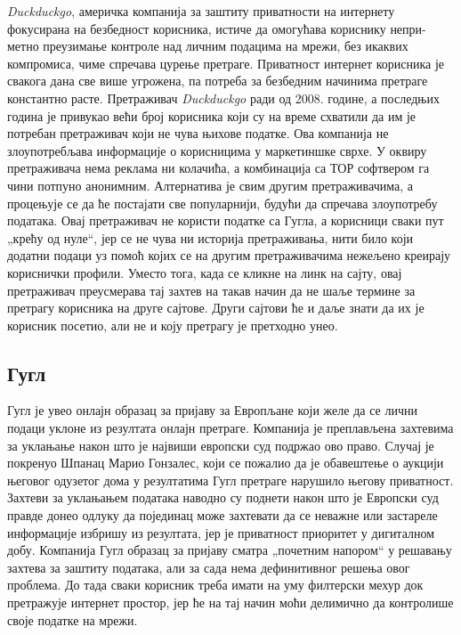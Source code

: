 \documentclass[a4paper]{article}
\begin{document}
\emph{Duckduckgo}, америчка компанија за заштиту приватности на интернету фокусирана на безбедност корисника, истиче да омогућава кориснику непри-
метно преузимање контроле над личним подацима на мрежи, без икаквих компромиса, чиме спречава цурење претраге. Приватност интернет корисника је свакога дана све више угрожена, па потреба за безбедним начинима претраге константно расте. Претраживач \emph{Duckduckgo} ради од 2008. године, а последњих година је привукао већи број корисника који су на време схватили да им је потребан претраживач који не чува њихове податке. Ова компанија не злоупотребљава информације о корисницима у маркетиншке сврхе. У оквиру претраживача нема реклама ни колачића, а комбинација са ТОР софтвером га чини потпуно анонимним. Алтернатива је свим другим претраживачима, а процењује се да ће постајати све популарнији, будући да спречава злоупотребу података. Овај претраживач не користи податке са Гугла, а корисници сваки пут „крећу од нуле“, јер се не чува ни историја претраживања, нити било који додатни подаци уз помоћ којих се на другим претраживачима нежељено креирају кориснички профили. Уместо тога, када се кликне на линк на сајту, овај претраживач преусмерава тај захтев на такав начин да не шаље термине за претрагу корисника на друге сајтове. Други сајтови ће и даље знати да их је корисник посетио, али не и коју претрагу је претходно унео. 

\subsection{Гугл}
\label{podnaslov8}

Гугл је увео онлајн образац за пријаву за Европљане који желе да се лични подаци уклоне из резултата онлајн претраге. Компанија је преплављена захтевима за уклањање након што је највиши европски суд подржао ово право. Случај је покренуо
Шпанац Марио Гонзалес, који се пожалио да је обавештење о аукцији његовог одузетог дома у резултатима Гугл претраге нарушило његову приватност. Захтеви за уклањањем података наводно су поднети након што је Европски суд правде донео одлуку да појединац може захтевати да се неважне или застареле информације избришу из резултата, јер је приватност приоритет у дигиталном добу. Компанија Гугл образац за пријаву сматра „почетним напором“ у решавању захтева за заштиту података, али за сада нема дефинитивног решења овог проблема. До тада сваки корисник треба имати на уму филтерски мехур док претражује интернет простор, јер ће на тај начин моћи делимично да контролише своје податке на мрежи.
\end{document}
